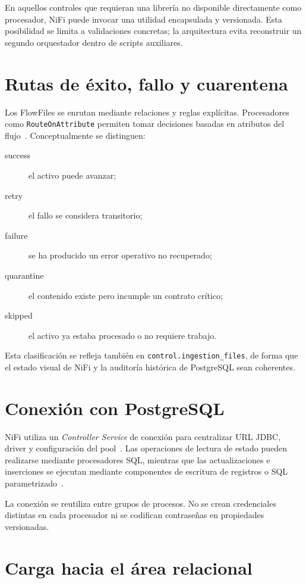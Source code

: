 En aquellos controles que requieran una librería no disponible directamente como procesador, NiFi puede invocar una utilidad encapsulada y versionada. Esta posibilidad se limita a validaciones concretas; la arquitectura evita reconstruir un segundo orquestador dentro de scripts auxiliares.

\section{Rutas de éxito, fallo y cuarentena}

Los FlowFiles se enrutan mediante relaciones y reglas explícitas. Procesadores como \texttt{RouteOnAttribute} permiten tomar decisiones basadas en atributos del flujo~\cite{nifi_routeattribute}. Conceptualmente se distinguen:

\begin{description}
\item[success] el activo puede avanzar;
\item[retry] el fallo se considera transitorio;
\item[failure] se ha producido un error operativo no recuperado;
\item[quarantine] el contenido existe pero incumple un contrato crítico;
\item[skipped] el activo ya estaba procesado o no requiere trabajo.
\end{description}

Esta clasificación se refleja también en \texttt{control.ingestion\_files}, de forma que el estado visual de NiFi y la auditoría histórica de PostgreSQL sean coherentes.

\section{Conexión con PostgreSQL}

NiFi utiliza un \textit{Controller Service} de conexión para centralizar URL JDBC, driver y configuración del pool~\cite{nifi_dbcp}. Las operaciones de lectura de estado pueden realizarse mediante procesadores SQL, mientras que las actualizaciones e inserciones se ejecutan mediante componentes de escritura de registros o SQL parametrizado~\cite{nifi_putdbrecord}.

La conexión se reutiliza entre grupos de procesos. No se crean credenciales distintas en cada procesador ni se codifican contraseñas en propiedades versionadas.

\section{Carga hacia el área relacional}

